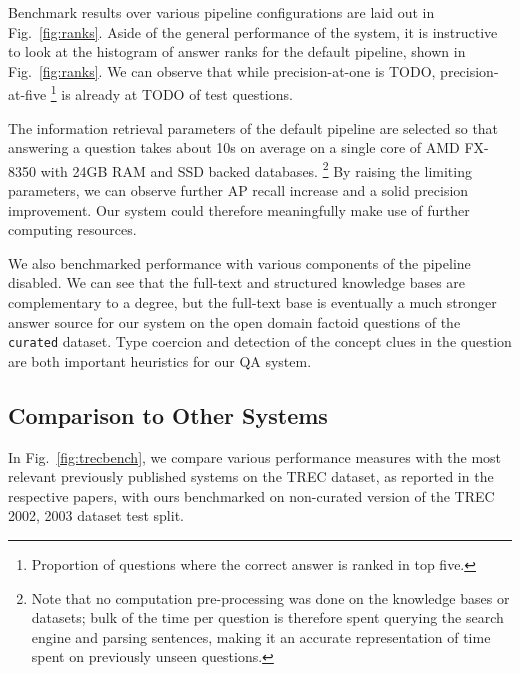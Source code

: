 Benchmark results over various pipeline configurations are laid out in Fig.~\ref{fig:ranks}.
Aside of the general performance of the system,
it is instructive to look at the histogram of answer ranks
for the default pipeline, shown in Fig.~\ref{fig:ranks}.
We can observe that while precision-at-one is TODO,
precision-at-five%
\footnote{Proportion of questions where the correct answer is ranked in top five.}
is already at TODO of test questions.

The information retrieval parameters of the default pipeline are selected so
that answering a question takes about 10s on average on a single core of
AMD FX-8350 with 24GB RAM and SSD backed databases.%
\footnote{Note that no computation pre-processing was done on the knowledge bases or datasets;
bulk of the time per question is therefore spent querying the search engine and parsing sentences,
making it an accurate representation of time spent on previously unseen questions.}
By raising the limiting
parameters, we can observe further AP recall increase and a solid precision improvement.
Our system could therefore meaningfully make use of further computing resources.

We also benchmarked performance with various components of the pipeline
disabled.  We can see that the full-text and structured knowledge bases
are complementary to a degree, but the full-text base is eventually
a much stronger answer source for our system on the open domain factoid
questions of the \texttt{curated} dataset.  Type coercion and detection
of the concept clues in the question are both important heuristics for
our QA system.

\subsection{Comparison to Other Systems}

In Fig.~\ref{fig:trecbench}, we compare various performance measures
with the most relevant previously published systems
on the TREC dataset, as reported in the respective papers,
with ours benchmarked on non-curated version of the TREC 2002, 2003 dataset test split.

